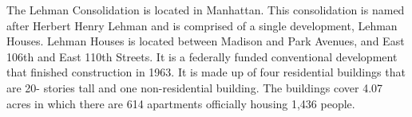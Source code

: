      

   

The Lehman Consolidation is located in Manhattan. This consolidation is named after Herbert Henry Lehman and is comprised of a single development, Lehman Houses. Lehman Houses is located between Madison and Park Avenues, and East 106th and East 110th Streets. It is a federally funded conventional development that finished construction in 1963. It is made up of four residential buildings that are 20- stories tall and one non-residential building. The buildings cover 4.07 acres in which there are 614 apartments officially housing 1,436 people. 